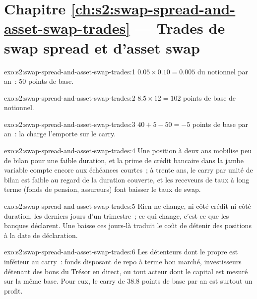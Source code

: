 \section*{Chapitre \ref{ch:s2:swap-spread-and-asset-swap-trades} --- Trades de swap spread et d'asset swap}

\begin{solution}{exo:s2:swap-spread-and-asset-swap-trades:1}
$0.05 \times 0.10 = 0.005$ du notionnel par an~: 50 points de base.
\end{solution}

\begin{solution}{exo:s2:swap-spread-and-asset-swap-trades:2}
$8.5 \times 12 = 102$ points de base de notionnel.
\end{solution}

\begin{solution}{exo:s2:swap-spread-and-asset-swap-trades:3}
$40 + 5 - 50 = -5$ points de base par an~: la charge l'emporte sur le carry.
\end{solution}

\begin{solution}{exo:s2:swap-spread-and-asset-swap-trades:4}
Une position à deux ans mobilise peu de bilan pour une faible duration, et la prime de crédit bancaire dans la jambe variable compte encore aux échéances courtes~;
à trente ans, le carry par unité de bilan est faible au regard de la duration couverte, et les receveurs de taux à long terme (fonds de pension, assureurs)
font baisser le taux de swap.
\end{solution}

\begin{solution}{exo:s2:swap-spread-and-asset-swap-trades:5}
Rien ne change, ni côté crédit ni côté duration, les derniers jours d'un trimestre~; ce qui change, c'est ce que les banques déclarent. Une baisse ces jours-là traduit le coût de
détenir des positions à la date de déclaration.
\end{solution}

\begin{solution}{exo:s2:swap-spread-and-asset-swap-trades:6}
Les détenteurs dont le  propre est inférieur au carry~: fonds disposant de repo à terme bon marché, investisseurs détenant des bons du Trésor en direct, ou tout acteur dont le capital est
mesuré sur la même base. Pour eux, le carry de 38.8 points de base par an est surtout un profit.
\end{solution}


